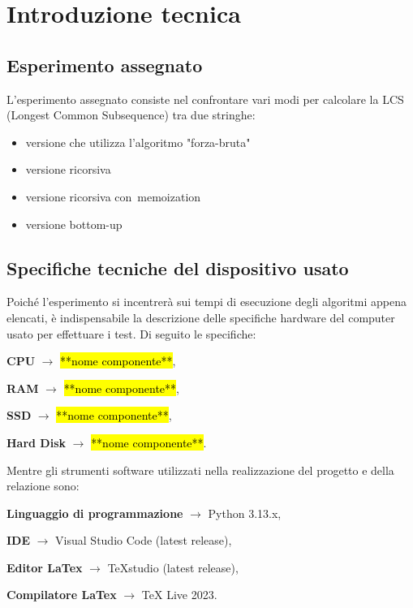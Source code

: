 \section{Introduzione tecnica}

	\subsection{Esperimento assegnato}
		L'esperimento assegnato consiste nel confrontare vari modi per calcolare la LCS (Longest Common Subsequence) tra due stringhe:
		\begin{itemize}
			\item versione che utilizza l'algoritmo "forza-bruta"
			\item versione ricorsiva
			\item versione ricorsiva con memoization
			\item versione bottom-up
		\end{itemize}
	
	\subsection{Specifiche tecniche del dispositivo usato}
		Poiché l'esperimento si incentrerà sui tempi di esecuzione degli algoritmi appena elencati, è indispensabile la descrizione delle specifiche hardware del computer usato per effettuare i test. Di seguito le specifiche:
			\begin{DESC}{1}
				\item[\textbf{CPU}] $\rightarrow$ \hl{**nome componente**},
				\item[\textbf{RAM}] $\rightarrow$ \hl{**nome componente**},
				\item[\textbf{SSD}] $\rightarrow$ \hl{**nome componente**},
				\item[\textbf{Hard Disk}] $\rightarrow$ \hl{**nome componente**}.
			\end{DESC}
		Mentre gli strumenti software utilizzati nella realizzazione del progetto e della relazione sono:
			\begin{DESC}{1}
				\item [\textbf{Linguaggio di programmazione}] $\rightarrow$ Python 3.13.x,
				\item[\textbf{IDE}] $\rightarrow$ Visual Studio Code (latest release),
				\item[\textbf{Editor LaTex}] $\rightarrow$ TeXstudio (latest release),
				\item[\textbf{Compilatore LaTex}] $\rightarrow$ TeX Live 2023. 
			\end{DESC}
			
